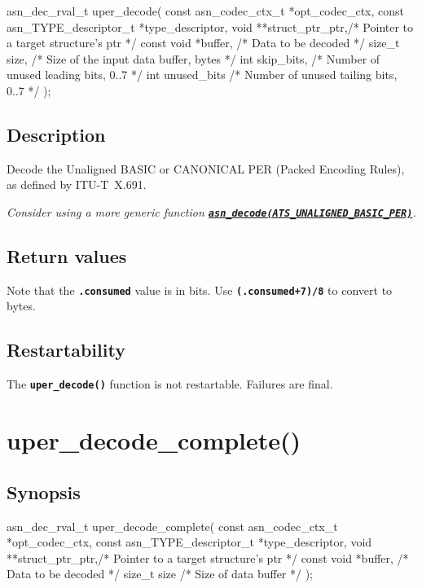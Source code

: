\documentclass[english,oneside,12pt]{book}
\newcommand{\apisection}[2]{\clearpage\section{\label{#1}#2}}
\newcommand{\api}[2]{\hyperref[#1]{\code{#2}}}
\newcommand{\code}[1]{\texttt{\textbf{\lstinline{#1}}}}
\begin{document}
\begin{signature}
asn_dec_rval_t uper_decode(
    const asn_codec_ctx_t *opt_codec_ctx,
    const asn_TYPE_descriptor_t *type_descriptor,
    void **struct_ptr_ptr,/* Pointer to a target structure's ptr */
    const void *buffer,   /* Data to be decoded */
    size_t size,          /* Size of the input data buffer, bytes */
    int skip_bits,        /* Number of unused leading bits, 0..7 */
    int unused_bits       /* Number of unused tailing bits, 0..7 */
);
\end{signature}

\subsection*{Description}

Decode the Unaligned BASIC or CANONICAL PER (Packed Encoding Rules),
as defined by ITU-T~X.691.\newline

\noindent\emph{Consider using a more generic function \api{sec:asn_decode}{asn_decode(ATS_UNALIGNED_BASIC_PER)}.}

\subsection*{Return values}

Note that the \code{.consumed} value is in bits.
Use \code{(.consumed+7)/8} to convert to bytes.

\subsection*{Restartability}
The \code{uper_decode()} function is not restartable.
Failures are final.

\apisection{sec:uper_decode_complete}{uper\_decode\_complete()}

\subsection*{Synopsis}

\begin{signature}
asn_dec_rval_t uper_decode_complete(
    const asn_codec_ctx_t *opt_codec_ctx,
    const asn_TYPE_descriptor_t *type_descriptor,
    void **struct_ptr_ptr,/* Pointer to a target structure's ptr */
    const void *buffer,   /* Data to be decoded */
    size_t size           /* Size of data buffer */
);
\end{signature}
\end{document}
